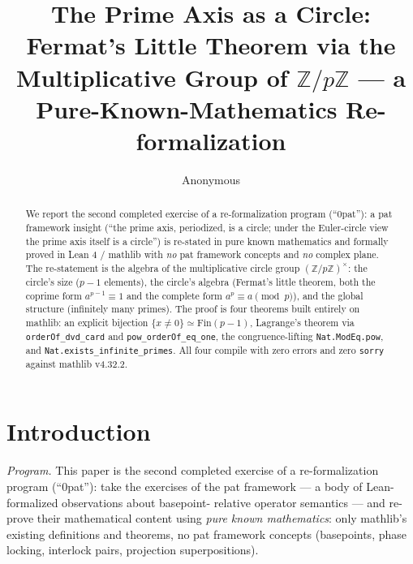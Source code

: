 \documentclass[sigplan,10pt,anonymous,review]{acmart}
\begin{document}
\title{The Prime Axis as a Circle:\\ Fermat's Little Theorem via the
Multiplicative Group of $\mathbb{Z}/p\mathbb{Z}$ --- a Pure-Known-Mathematics
Re-formalization}

\author{Anonymous}

\begin{abstract}
We report the second completed exercise of a re-formalization program
(``0pat''): a pat framework insight (``the prime axis, periodized, is a
circle; under the Euler-circle view the prime axis itself is a circle'') is
re-stated in pure known mathematics and formally proved in Lean 4 / mathlib
with \emph{no} pat framework concepts and \emph{no} complex plane. The
re-statement is the algebra of the multiplicative circle group
$(\mathbb{Z}/p\mathbb{Z})^\times$: the circle's size ($p-1$ elements),
the circle's algebra (Fermat's little theorem, both the coprime form
$a^{p-1} \equiv 1$ and the complete form $a^p \equiv a \pmod p$), and the
global structure (infinitely many primes). The proof is four theorems built
entirely on mathlib: an explicit bijection
$\{x \ne 0\} \simeq \mathrm{Fin}(p-1)$, Lagrange's theorem via
\texttt{orderOf\_dvd\_card} and \texttt{pow\_orderOf\_eq\_one}, the
congruence-lifting \texttt{Nat.ModEq.pow}, and
\texttt{Nat.exists\_infinite\_primes}. All four compile with zero errors
and zero \texttt{sorry} against mathlib v4.32.2.
\end{abstract}


\maketitle

\section{Introduction}

\emph{Program.} This paper is the second completed exercise of a
re-formalization program (``0pat''): take the exercises of the pat
framework --- a body of Lean-formalized observations about basepoint-
relative operator semantics --- and re-prove their mathematical content
using \emph{pure known mathematics}: only mathlib's existing definitions
and theorems, no pat framework concepts (basepoints, phase locking,
interlock pairs, projection superpositions).
\end{document}
